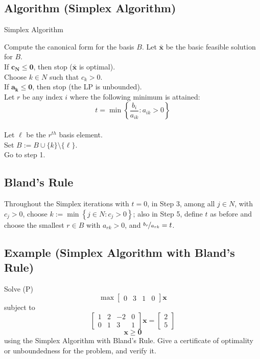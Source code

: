 \begin{algbox}
    \subsection{Algorithm (Simplex Algorithm)}
    \begin{algorithm}[H]
        \caption{Simplex Algorithm}
        Compute the canonical form for the basis $B$. Let $\bm{\bar{x}}$ 
        be the basic feasible solution for $ B $.\\
        If $\bm{c_N}\le \bm{0}$, then stop ($\bm{\bar{x}}$ is optimal).\\
        Choose $k\in N$ such that $c_k>0$.\\
        If $\bm{a_k}\le \bm{0}$, then stop (the LP is unbounded).\\
        Let $r$ be any index $ i $ where the following minimum is attained:
        \[t=\min\left\{\frac{b_i}{a_{ik}} : a_{ik}>0\right\}\]\\
        Let $\ell$ be the $r^{th}$ basis element.\\
        Set $B:=B\cup\{k\}\setminus\{\ell\}$.\\
        Go to step 1.
    \end{algorithm}
\end{algbox}

\begin{thmbox}
    \subsection{Bland's Rule}
    Throughout the Simplex iterations with $ t=0 $, in Step 3, among
    all $ j\in N $, with $ c_j>0 $, choose $ k:=\min\left\{ j\in N:c_j>0\right\} $;
    also in Step 5, define $ t $ as before and choose the smallest
    $ r\in B $ with $ a_{rk}>0 $, and $ \nicefrac{b_r}{a_{rk}}=t $.
\end{thmbox}

\subsection{Example (Simplex Algorithm with Bland's Rule)}
Solve
(P)
\[ \max
\begin{bmatrix}
    0 & 3 & 1 & 0
\end{bmatrix}\bm{x} \]
subject to
\[ 
\begin{bmatrix}
    1 & 2 & -2 & 0\\
    0 & 1 & 3 & 1
\end{bmatrix}\bm{x}=
\begin{bmatrix}
    2\\
    5
\end{bmatrix} \]
\[ \bm{x}\ge \bm{0} \]
using the Simplex Algorithm with Bland's Rule. Give a certificate
of optimality or unboundedness for the problem, and verify it.

